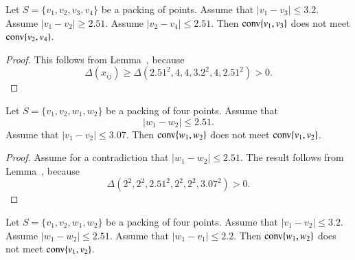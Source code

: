 \begin{tarskidata}
\begin{tarski}
\begin{lemma}
Let $S=\{v_1,v_2,v_3,v_4\}$ be a packing of points.
  Assume that
	$|v_1-v_3|\le 3.2$.  Assume $|v_1-v_2|\ge 2.51$.
Assume $|v_2-v_4|\le 2.51$.
Then ${\operatorname{conv}}\{v_1,v_3\}$ does not meet
${\operatorname{conv}}\{v_2,v_4\}$.
\end{lemma}


\begin{proof}  This follows from Lemma~,
because    
   $$
    \Delta(x_{ij})\ge \Delta(2.51^2,4,4,3.2^2,4,2.51^2)>0.
    $$
\end{proof}
\end{tarski}


    


\begin{tarski}

\begin{lemma}
Let $S=\{v_1,v_2,w_1,w_2\}$ be a packing of four points.
Assume that
	$$|w_1-w_2|\le 2.51.$$
Assume that $|v_1-v_2|\le 3.07$.  
Then
${\operatorname{conv}}\{w_1,w_2\}$ does not meet ${\operatorname{conv}}\{v_1,v_2\}$.
\end{lemma}


\begin{proof}
Assume for a contradiction that $|w_1-w_2|\le2.51$.
The result follows from  Lemma~,
because 
    $$
    \Delta(2^2,2^2,2.51^2,2^2,2^2,3.07^2) > 0.
    $$
\end{proof}
\end{tarski}





\begin{tarski}

\begin{lemma}
Let $S=\{v_1,v_2,w_1,w_2\}$ be a packing of four points. 
Assume that $|v_1-v_2|\le 3.2$.  Assume $|w_1-w_2|\le 2.51$. 
Assume that
	$|w_1-v_1|\le 2.2$.
Then
${\operatorname{conv}}\{w_1,w_2\}$ does not meet ${\operatorname{conv}}\{v_1,v_2\}$.
\end{lemma}


\end{tarski}
\end{tarskidata}
